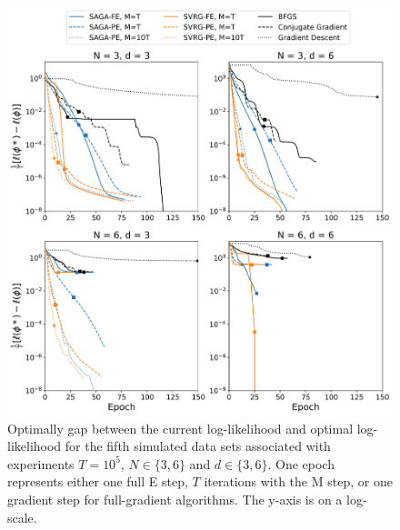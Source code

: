 \documentclass[12pt]{article}
\begin{document}
\begin{figure}[H]
    \centering
    \includegraphics[width=6.5in]{../plt/log-like_v_epoch_T-100000-004.png}
    \caption{Optimally gap between the current log-likelihood and optimal log-likelihood for the fifth simulated data sets associated with experiments $T=10^{5}$, $N \in \{3,6\}$ and $d \in \{3,6\}$. One epoch represents either one full E step, $T$ iterations with the M step, or one gradient step for full-gradient algorithms. The y-axis is on a log-scale.}
\end{figure}
\end{document}
